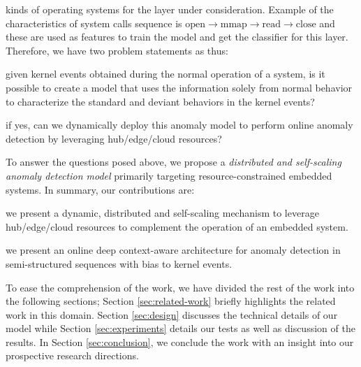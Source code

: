 kinds of operating systems for the layer under consideration. Example of the 
characteristics of system calls sequence is $\text{open} \longrightarrow
\text{mmap} \longrightarrow \text{read} \longrightarrow \text{close}$ and 
these are used as features to train the model and get the classifier for this 
layer. Therefore, we have two problem statements as thus: 
\begin{enumerate*}[label={\alph*)},font={\bfseries}]
	\item given kernel events obtained during the normal operation of a system, 
	is it possible to create a model that uses the information solely from 
	normal behavior to characterize the standard and deviant behaviors in the 
	kernel events?
	\item if yes, can we dynamically deploy this anomaly model to perform 
	online anomaly detection by leveraging hub/edge/cloud resources?
\end{enumerate*}
To answer the questions posed above, we propose a \emph{distributed and 
self-scaling anomaly detection model} primarily targeting resource-constrained 
embedded systems. In summary, our contributions are:
\begin{enumerate*}[label={\alph*)},font={\bfseries}]
	\item we present a dynamic, distributed and self-scaling mechanism to 
	leverage hub/edge/cloud resources to complement the operation of an 
	embedded system.
	\item we present an online deep context-aware architecture for anomaly 
	detection in semi-structured sequences with bias to kernel events.
\end{enumerate*} \par
To ease the comprehension of the work, we have divided the rest of the work 
into the following sections; Section \ref{sec:related-work} briefly highlights 
the related work in this domain. Section \ref{sec:design} discusses the 
technical details of our model while Section \ref{sec:experiments} details our 
tests as well as discussion of the results. In Section \ref{sec:conclusion}, we 
conclude the work with an insight into our prospective research directions.

